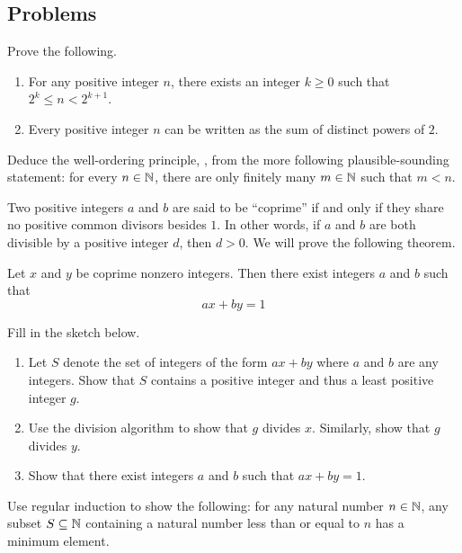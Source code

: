 \documentclass[../main.tex]{subfiles}
\begin{document}
\subsection{Problems}
\begin{homework}
    Prove the following.
    \begin{enumerate}[label=(\alph*)]
        \item For any positive integer $n$, there exists an integer $k\ge0$ such that $2^k\le n<2^{k+1}$.
        \item Every positive integer $n$ can be written as the sum of distinct powers of $2$.
    \end{enumerate}
\end{homework}

\begin{homework}
    Deduce the well-ordering principle, , from the more following plausible-sounding statement: for every $n \in \mathbb N$, there are only finitely many $m \in \mathbb N$ such that $m < n$.
\end{homework}

\begin{homework}
    Two positive integers $a$ and $b$ are said to be ``coprime'' if and only if they share no positive common divisors besides $1$. In other words, if $a$ and $b$ are both divisible by a positive integer $d$, then $d>0$. We will prove the following theorem.
    \begin{theorem}[Bezout]
        Let $x$ and $y$ be coprime nonzero integers. Then there exist integers $a$ and $b$ such that
        \begin{equation*}
            ax + by = 1
        \end{equation*}
    \end{theorem}
    Fill in the sketch below.
    \begin{enumerate}[label=(\alph*)]
        \item Let $S$ denote the set of integers of the form $ax+by$ where $a$ and $b$ are any integers. Show that $S$ contains a positive integer and thus a least positive integer $g$.
        \item Use the division algorithm to show that $g$ divides $x$. Similarly, show that $g$ divides $y$.
        \item Show that there exist integers $a$ and $b$ such that $ax+by=1$.
    \end{enumerate}
\end{homework}

\begin{homework}
    Use regular induction to show the following: for any natural number $n\in\mathbb N$, any subset $S\subseteq\mathbb N$ containing a natural number less than or equal to $n$ has a minimum element.
\end{homework}
\end{document}
